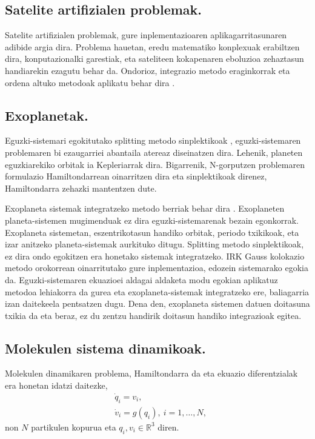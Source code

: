 \subsection*{Satelite artifizialen problemak.}
    
Satelite artifizialen problemak,  gure inplementazioaren aplikagarritasunaren adibide argia dira. Problema hauetan, eredu matematiko konplexuak erabiltzen dira, konputazionalki garestiak, eta sateliteen kokapenaren eboluzioa zehaztasun handiarekin ezagutu behar da. Ondorioz, integrazio metodo eraginkorrak eta  ordena altuko metodoak aplikatu behar dira \cite{Beylkin2014}.    

\subsection*{Exoplanetak.}

Eguzki-sistemari egokitutako splitting metodo sinplektikoak \cite{Wisdom1991,Laskar2001}, eguzki-sistemaren problemaren bi ezaugarriei abantaila atereaz diseinatzen dira. Lehenik, planeten eguzkiarekiko orbitak ia Kepleriarrak dira. Bigarrenik, N-gorputzen problemaren formulazio Hamiltondarrean oinarritzen dira eta sinplektikoak direnez, Hamiltondarra zehazki mantentzen dute. 

Exoplaneta sistemak integratzeko metodo berriak behar dira \cite{Fabrycky2010}. Exoplaneten planeta-sistemen mugimenduak ez dira eguzki-sistemarenak bezain egonkorrak. Exoplaneta sistemetan, eszentrikotasun handiko orbitak, periodo txikikoak, eta izar anitzeko planeta-sistemak aurkituko ditugu. Splitting metodo sinplektikoak, ez dira ondo egokitzen era honetako sistemak integratzeko.
IRK Gauss kolokazio metodo orokorrean oinarritutako gure inplementazioa, edozein sistemarako egokia da. Eguzki-sistemaren ekuazioei aldagai aldaketa modu egokian aplikatuz metodoa lehiakorra da gurea eta exoplaneta-sistemak integratzeko ere,  baliagarria izan daitekeela pentsatzen dugu. Dena den, exoplaneta sistemen datuen doitasuna txikia da  eta beraz, ez du zentzu handirik doitasun handiko integrazioak egitea.         
 
\subsection*{Molekulen sistema dinamikoak.}

Molekulen dinamikaren problema, Hamiltondarra da eta ekuazio diferentzialak era honetan idatzi daitezke,
\begin{align*}
&\dot{q}_i=v_i, \\
&\dot{v}_i=g(q_i), \ i=1,\dots,N,
\end{align*}
non $N$ partikulen kopurua eta $q_i,v_i \in \mathbb{R}^3$ diren.

